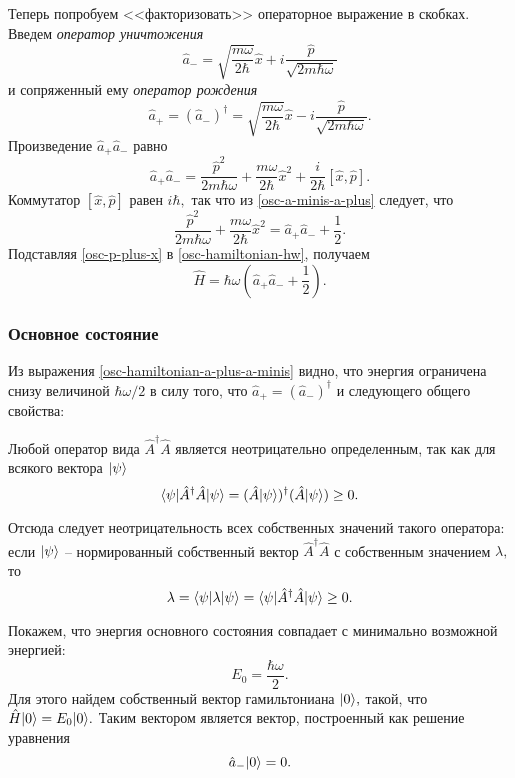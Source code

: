 \documentclass[b5paper]{book}
\DeclarePairedDelimiter\bra{\langle}{\rvert}
\DeclarePairedDelimiter\ket{\lvert}{\rangle}
\begin{document}
Теперь попробуем <<факторизовать>> операторное выражение в скобках. Введем \textit{оператор уничтожения}
$$\hat a_{-} = \sqrt{\frac{m\omega}{2\hbar}} \hat x + i \frac {\hat p} {\sqrt{2 m \hbar \omega}}$$
и сопряженный ему \textit{оператор рождения}
$$\hat a_{+} = (\hat a_{-})^\dagger =  \sqrt{\frac{m\omega}{2\hbar}} \hat x - i \frac {\hat p} {\sqrt{2 m \hbar \omega}}.$$
Произведение $\hat a_{+} \hat a_{-}$ равно
\begin{equation}\label{osc-a-minis-a-plus}
 \hat a_{+} \hat a_{-} = \frac {\hat p^2} {2 m \hbar \omega} + \frac {m\omega} {2\hbar} \hat x^2 +
\frac {i} {2\hbar} [\hat x, \hat p].
\end{equation}
Коммутатор $[\hat x, \hat p]$ равен $i \hbar,$ так что из \eqref{osc-a-minis-a-plus} следует, что
\begin{equation}\label{osc-p-plus-x}
\frac {\hat p^2} {2 m \hbar \omega} + \frac {m\omega} {2\hbar} \hat x^2 = \hat a_{+} \hat a_{-} +
\frac {1} {2}.
\end{equation}
Подставляя \eqref{osc-p-plus-x} в \eqref{osc-hamiltonian-hw}, получаем
\begin{equation}\label{osc-hamiltonian-a-plus-a-minis}
 \hat H = \hbar \omega \left(\hat a_{+} \hat a_{-} + \frac {1} {2}\right).
\end{equation}

\subsubsection*{Основное состояние}

Из выражения \eqref{osc-hamiltonian-a-plus-a-minis} видно, что энергия ограничена снизу величиной
$\hbar \omega / 2$
в силу того, что $\hat a_{+} = (\hat a_{-})^\dagger$ и следующего общего свойства:

\begin{mathadd}{}
    Любой оператор вида $\hat A^{\dagger} \hat A$ является неотрицательно определенным, так как
    для всякого вектора $\ket{\psi}$
    $$\bra{\psi} \hat A^{\dagger} \hat A \ket{\psi} = (\hat A \ket{\psi})^{\dagger} (\hat A \ket{\psi}) \geq 0.$$

    Отсюда следует неотрицательность всех собственных значений такого оператора: если $\ket{\psi}$ -- нормированный собственный вектор $\hat A^{\dagger} \hat A$ с собственным значением $\lambda,$ то
    $$\lambda = \bra{\psi} \lambda \ket{\psi} = \bra{\psi} \hat A^{\dagger} \hat A \ket{\psi} \geq 0.$$
\end{mathadd}

Покажем, что энергия основного состояния совпадает с минимально возможной энергией:
$$E_0 = \frac {\hbar \omega} {2}.$$ Для этого найдем собственный вектор гамильтониана $\ket{0},$
такой, что $\hat H \ket{0} = E_0 \ket{0}.$ Таким вектором является вектор, построенный как решение
уравнения
$$\hat a_{-} \ket {0} = 0.$$
\end{document}
